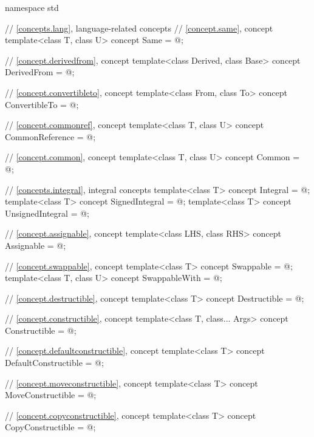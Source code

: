 %
\begin{codeblock}
namespace std {
  // \ref{concepts.lang}, language-related concepts
  // \ref{concept.same}, concept 
  template<class T, class U>
    concept Same = @\seebelow@;

  // \ref{concept.derivedfrom}, concept 
  template<class Derived, class Base>
    concept DerivedFrom = @\seebelow@;

  // \ref{concept.convertibleto}, concept 
  template<class From, class To>
    concept ConvertibleTo = @\seebelow@;

  // \ref{concept.commonref}, concept 
  template<class T, class U>
    concept CommonReference = @\seebelow@;

  // \ref{concept.common}, concept 
  template<class T, class U>
    concept Common = @\seebelow@;

  // \ref{concepts.integral}, integral concepts
  template<class T>
    concept Integral = @\seebelow@;
  template<class T>
    concept SignedIntegral = @\seebelow@;
  template<class T>
    concept UnsignedIntegral = @\seebelow@;

  // \ref{concept.assignable}, concept 
  template<class LHS, class RHS>
    concept Assignable = @\seebelow@;

  // \ref{concept.swappable}, concept 
  template<class T>
    concept Swappable = @\seebelow@;
  template<class T, class U>
    concept SwappableWith = @\seebelow@;

  // \ref{concept.destructible}, concept 
  template<class T>
    concept Destructible = @\seebelow@;

  // \ref{concept.constructible}, concept 
  template<class T, class... Args>
    concept Constructible = @\seebelow@;

  // \ref{concept.defaultconstructible}, concept 
  template<class T>
    concept DefaultConstructible = @\seebelow@;

  // \ref{concept.moveconstructible}, concept 
  template<class T>
    concept MoveConstructible = @\seebelow@;

  // \ref{concept.copyconstructible}, concept 
  template<class T>
    concept CopyConstructible = @\seebelow@;

}
\end{codeblock}
